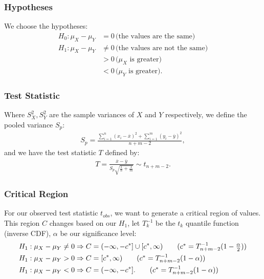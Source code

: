 \documentclass[a4paper, 12pt, twoside]{article}
\begin{document}
\subsubsection{Hypotheses}

We choose the hypotheses:
\begin{align*}
    H_0 : \mu_X - \mu_Y & = 0 \, \text{(the values are the same)}        \\
    H_1 : \mu_X - \mu_Y & \neq 0 \, \text{(the values are not the same)} \\
                        & > 0 \, \text{($\mu_X$ is greater)}             \\
                        & < 0 \, \text{($\mu_Y$ is greater)}.
\end{align*}

\subsubsection{Test Statistic}

Where $S_X^2, S_Y^2$ are the sample variances of $X$ and $Y$
respectively, we define the pooled variance $S_p$:
\begin{align*}
    S_p = \frac{\sum_{i = 1}^n (x_i - \overline{x})^2
        + \sum_{i = 1}^m (y_i - \overline{y})^2}{n + m - 2},
\end{align*}
and we have the test statistic $T$ defined by:
\begin{align*}
    T = \frac{\overline{x} - \overline{y}}
    {S_p\sqrt{\frac{1}{n} + \frac{1}{m}}} \sim t_{n + m - 2}.
\end{align*}

\subsubsection{Critical Region}

For our observed test statistic $t_{obs}$, we want to generate a
critical region of values. This region $C$ changes based on our
$H_1$, let $T^{-1}_k$ be the $t_k$ quantile function (inverse CDF),
$\alpha$ be our significance level:
\begin{align*}
    H_1 : \mu_X - \mu_Y \neq 0 & \Rightarrow
    C = (-\infty, -c^*] \cup [c^*, \infty)
    \tag{$ c^* = T^{-1}_{n + m - 2}(1 - \frac{\alpha}{2}) $}         \\
    H_1 : \mu_X - \mu_Y > 0    & \Rightarrow
    C = [c^*, \infty) \tag{$ c^* = T^{-1}_{n + m - 2}(1 - \alpha) $} \\
    H_1 : \mu_X - \mu_Y < 0    & \Rightarrow C = (-\infty, -c^*].
    \tag{$ c^* = T^{-1}_{n + m - 2}(1 - \alpha) $}
\end{align*}
\end{document}
